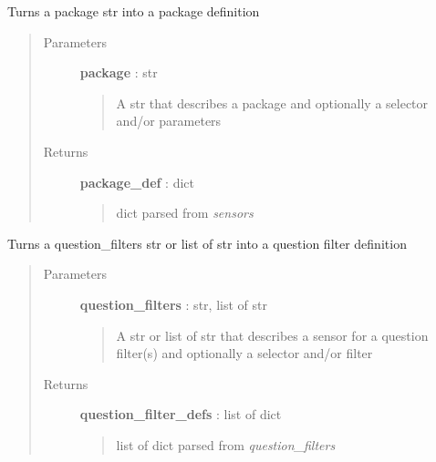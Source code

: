 \documentclass[letterpaper,10pt,english]{sphinxmanual}
\begin{document}
\begin{fulllineitems}
\label{pytan.utils:pytan.utils.dehumanize_package}
Turns a package str into a package definition
\begin{quote}\begin{description}
\item[{Parameters}] \leavevmode
\textbf{package} : str
\begin{quote}

A str that describes a package and optionally a selector and/or parameters
\end{quote}

\item[{Returns}] \leavevmode
\textbf{package\_def} : dict
\begin{quote}

dict parsed from \emph{sensors}
\end{quote}

\end{description}\end{quote}

\end{fulllineitems}


\begin{fulllineitems}
\label{pytan.utils:pytan.utils.dehumanize_question_filters}
Turns a question\_filters str or list of str into a question filter definition
\begin{quote}\begin{description}
\item[{Parameters}] \leavevmode
\textbf{question\_filters} : str, list of str
\begin{quote}

A str or list of str that describes a sensor for a question filter(s) and optionally a selector and/or filter
\end{quote}

\item[{Returns}] \leavevmode
\textbf{question\_filter\_defs} : list of dict
\begin{quote}

list of dict parsed from \emph{question\_filters}
\end{quote}

\end{description}\end{quote}

\end{fulllineitems}
\end{document}
